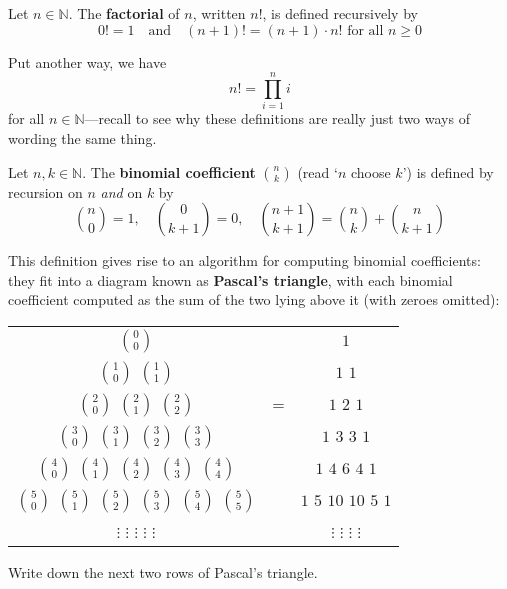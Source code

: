 \begin{definition}
\label{defFactorialRecursive}
Let $n \in \mathbb{N}$. The \textbf{factorial} of $n$, written $n!$, is defined recursively by
\[ 0! = 1 \quad \text{and} \quad (n+1)! = (n+1) \cdot n! \text{ for all } n \ge 0 \]
\end{definition}

Put another way, we have
\[ n! = \prod_{i=1}^n i \]
for all $n \in \mathbb{N}$---recall  to see why these definitions are really just two ways of wording the same thing.

\begin{definition}
\label{defBinomialCoefficientRecursive}
Let $n,k \in \mathbb{N}$. The \textbf{binomial coefficient} $\binom{n}{k}$  (read `$n$ choose $k$') is defined by recursion on $n$ \textit{and} on $k$ by
\[ \binom{n}{0}=1, \quad \binom{0}{k+1} = 0, \quad \binom{n+1}{k+1} = \binom{n}{k} + \binom{n}{k+1} \]
\end{definition}

This definition gives rise to an algorithm for computing binomial coefficients: they fit into a diagram known as \textbf{Pascal's triangle}, with each binomial coefficient computed as the sum of the two lying above it (with zeroes omitted):

\begin{center}\begin{tabular}{ccc}
$\binom{0}{0}$ && $1$ \\
$\binom{1}{0}$ \quad $\binom{1}{1}$ && $1$ \quad $1$ \\
$\binom{2}{0}$ \quad $\binom{2}{1}$ \quad $\binom{2}{2}$ & = & $1$ \quad $2$ \quad $1$ \\
$\binom{3}{0}$ \quad $\binom{3}{1}$ \quad $\binom{3}{2}$ \quad $\binom{3}{3}$ && $1$ \quad $3$ \quad $3$ \quad $1$ \\
$\binom{4}{0}$ \quad $\binom{4}{1}$ \quad $\binom{4}{2}$ \quad $\binom{4}{3}$ \quad $\binom{4}{4}$ && $1$ \quad $4$ \quad $6$ \quad $4$ \quad $1$ \\
$\binom{5}{0}$ \quad $\binom{5}{1}$ \quad $\binom{5}{2}$ \quad $\binom{5}{3}$ \quad $\binom{5}{4}$ \quad $\binom{5}{5}$ && $1$ \quad $5$ \quad $10$ \quad $10$ \quad $5$ \quad $1$ \\
$\vdots$ \qquad $\vdots$ \qquad $\vdots$ \qquad $\vdots$ \qquad $\vdots$ && $\vdots$ \qquad $\vdots$ \qquad $\vdots$ \qquad $\vdots$
\end{tabular}\end{center}

\begin{exercise}
Write down the next two rows of Pascal's triangle.
\end{exercise}